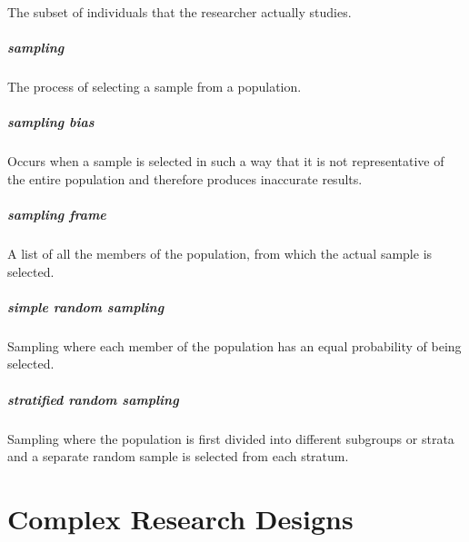 \documentclass[
]{krantz}
\begin{document}
The subset of individuals that the researcher actually studies.

\hypertarget{sampling-1}{%
\paragraph*{sampling}\label{sampling-1}}

The process of selecting a sample from a population.

\hypertarget{sampling-bias-1}{%
\paragraph*{sampling bias}\label{sampling-bias-1}}

Occurs when a sample is selected in such a way that it is not representative of the entire population and therefore produces inaccurate results.

\hypertarget{sampling-frame}{%
\paragraph*{sampling frame}\label{sampling-frame}}

A list of all the members of the population, from which the actual sample is selected.

\hypertarget{simple-random-sampling}{%
\paragraph*{simple random sampling}\label{simple-random-sampling}}

Sampling where each member of the population has an equal probability of being selected.

\hypertarget{stratified-random-sampling}{%
\paragraph*{stratified random sampling}\label{stratified-random-sampling}}

Sampling where the population is first divided into different subgroups or strata and a separate random sample is selected from each stratum.

\hypertarget{complex-research-designs}{%
\chapter{Complex Research Designs}\label{complex-research-designs}}
\end{document}
